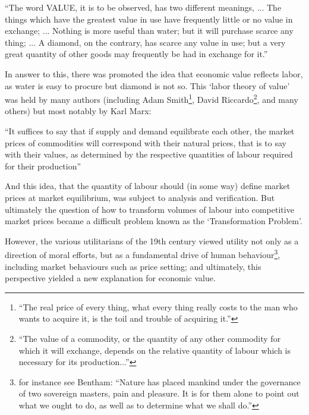 \begin{displayquote}
``The word VALUE, it is to be observed, has two different meanings, ... The things which have the greatest value in use have frequently little or no value in exchange; ... Nothing is more useful than water; but it will purchase scarce any thing; ... A diamond, on the contrary, has scarce any value in use; but a very great quantity of other goods may frequently be had in exchange for it.'' \citep{Smith1Gutenberg}
\end{displayquote}

In answer to this, there was promoted the idea that economic value reflects labor, as water is easy to procure but diamond is not so.
This `labor theory of value' was held by many authors (including Adam Smith\footnote{``The real price of every thing, what every thing really costs to the man who wants to acquire it, is the toil and trouble of acquiring it.''\cite{Smith1Gutenberg}}, David Riccardo\footnote{``The value of a commodity, or the quantity of any other commodity for which it will exchange, depends on the relative quantity of labour which is necessary for its production...''\cite[Section 1, Chapter 1]{Riccardo1Gutenberg}}, and many others) but most notably by Karl Marx:

\begin{displayquote}
``It suffices to say that if supply and demand equilibrate each other, the market prices of commodities will correspond with their natural prices, that is to say with their values, as determined by the respective quantities of labour required for their production'' \cite[Chapter 2]{marx1910value}
\end{displayquote}

And this idea, that the quantity of labour should (in some way) define market prices at market equilibrium, was subject to analysis and verification.
But ultimately the question of how to transform volumes of labour into competitive market prices became a difficult problem known as the `Transformation Problem'.

However, the various utilitarians of the 19th century viewed utility not only as a direction of moral efforts, but as a fundamental drive of human behaviour\footnote{for instance see Bentham: ``Nature has placed mankind under the governance of two sovereign masters, pain and pleasure.
It is for them alone to point out what we ought to do, as well as to determine what we shall do.''\cite{bentham1823introduction}}, including market behaviours such as price setting; and ultimately, this perspective yielded a new explanation for economic value.

